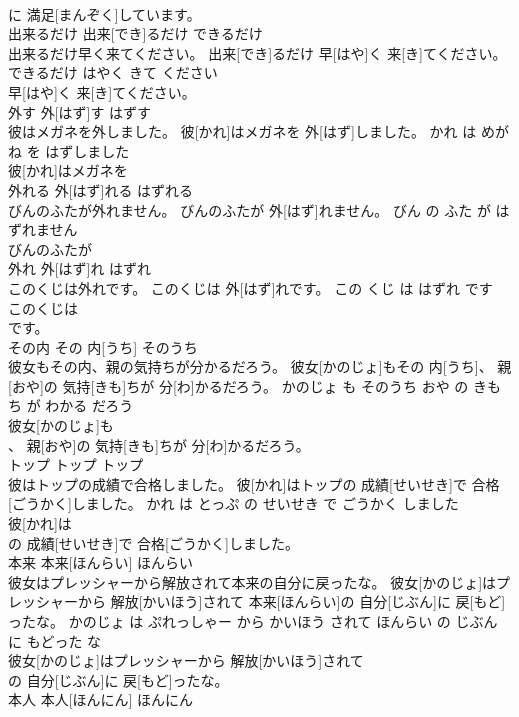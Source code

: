 \documentclass[8pt]{extreport}
\begin{document}
\begin{CJK}{UTF8}{min}
\\	に 満足[まんぞく]しています。			
\\	出来るだけ	出来[でき]るだけ	できるだけ	
\\	出来るだけ早く来てください。	出来[でき]るだけ 早[はや]く 来[き]てください。	できるだけ はやく きて ください	
\\	早[はや]く 来[き]てください。			
\\	外す	外[はず]す	はずす	
\\	彼はメガネを外しました。	彼[かれ]はメガネを 外[はず]しました。	かれ は めがね を はずしました	
\\	彼[かれ]はメガネを
\\	外れる	外[はず]れる	はずれる	
\\	びんのふたが外れません。	びんのふたが 外[はず]れません。	びん の ふた が はずれません	
\\	びんのふたが
\\	外れ	外[はず]れ	はずれ	
\\	このくじは外れです。	このくじは 外[はず]れです。	この くじ は はずれ です	
\\	このくじは
\\	です。			
\\	その内	その 内[うち]	そのうち	
\\	彼女もその内、親の気持ちが分かるだろう。	彼女[かのじょ]もその 内[うち]、 親[おや]の 気持[きも]ちが 分[わ]かるだろう。	かのじょ も そのうち おや の きもち が わかる だろう	
\\	彼女[かのじょ]も
\\	、 親[おや]の 気持[きも]ちが 分[わ]かるだろう。			
\\	トップ	トップ	トップ	
\\	彼はトップの成績で合格しました。	彼[かれ]はトップの 成績[せいせき]で 合格[ごうかく]しました。	かれ は とっぷ の せいせき で ごうかく しました	
\\	彼[かれ]は
\\	の 成績[せいせき]で 合格[ごうかく]しました。			
\\	本来	本来[ほんらい]	ほんらい	
\\	彼女はプレッシャーから解放されて本来の自分に戻ったな。	彼女[かのじょ]はプレッシャーから 解放[かいほう]されて 本来[ほんらい]の 自分[じぶん]に 戻[もど]ったな。	かのじょ は ぷれっしゃー から かいほう されて ほんらい の じぶん に もどった な	
\\	彼女[かのじょ]はプレッシャーから 解放[かいほう]されて
\\	の 自分[じぶん]に 戻[もど]ったな。			
\\	本人	本人[ほんにん]	ほんにん	

\end{CJK}
\end{document}

